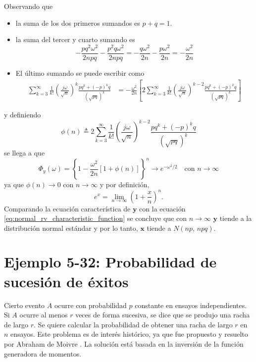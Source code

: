 \documentclass[a4paper]{report}
\newcommand{\x}{\mathbf{x}}
\newcommand{\y}{\mathbf{y}}
\begin{document}
Observando que
\begin{itemize}
 \item la suma de los dos primeros sumandos es \(p+q=1\).
 \item la suma del tercer y cuarto sumando es
 \[
  -\frac{pq^2\omega^2}{2npq}-\frac{p^2q\omega^2}{2npq}=-\frac{q\omega^2}{2n}-\frac{p\omega^2}{2n}=-\frac{\omega^2}{2n}
 \]
 \item El último sumando se puede escribir como
 \begin{align*}
  \sum_{k=3}^{\infty}\frac{1}{k!}\left(\frac{j\omega}{\sqrt{n}}\right)^k
  \frac{pq^k+(-p)^kq}{\left(\sqrt{pq}\right)^k}
   &=-\frac{\omega^2}{2n}\left[2\sum_{k=3}^{\infty}\frac{1}{k!}\left(\frac{j\omega}{\sqrt{n}}\right)^{k-2}
  \frac{pq^k+(-p)^kq}{\left(\sqrt{pq}\right)^k}\right]
 \end{align*}
\end{itemize}
y definiendo
\[
 \phi(n)\triangleq 2\sum_{k=3}^{\infty}\frac{1}{k!}\left(\frac{j\omega}{\sqrt{n}}\right)^{k-2}
  \frac{pq^k+(-p)^kq}{\left(\sqrt{pq}\right)^k}
\]
se llega a que
\[
 \Phi_y(\omega)=\left\{1-\frac{\omega^2}{2n}\left[1+\phi(n)\right]\right\}^n\to e^{-\omega^2/2}\quad\textrm{con }n\to\infty
\]
ya que \(\phi(n)\to0\) con \(n\to\infty\) y por definición,
\[
 e^{x}=\lim_{n\to\infty}\left(1+{\frac {x}{n}}\right)^{n}.
\]
Comparando la ecuación característica de \(\y\) con la ecuación \ref{eq:normal_rv_characteristic_function} se concluye que con \(n\to\infty\) \(\y\) tiende a la distribución normal estándar y por lo tanto, \(\x\) tiende a \(N(np,\,npq)\).

\section{Ejemplo 5-32: Probabilidad de sucesión de éxitos}

Cierto evento \(A\) ocurre con probabilidad \(p\) constante en ensayos independientes.
Si \(A\) ocurre al menos \(r\) veces de forma sucesiva, se dice que se produjo una racha de largo \(r\). Se quiere calcular la probabilidad de obtener una racha de largo \(r\) en \(n\) ensayos. Este problema es de interés histórico, ya que fue propuesto y resuelto por Abraham de Moivre \cite{papoulis2002probability}. La solución está basada en la inversión de la función generadora de momentos.
\end{document}
